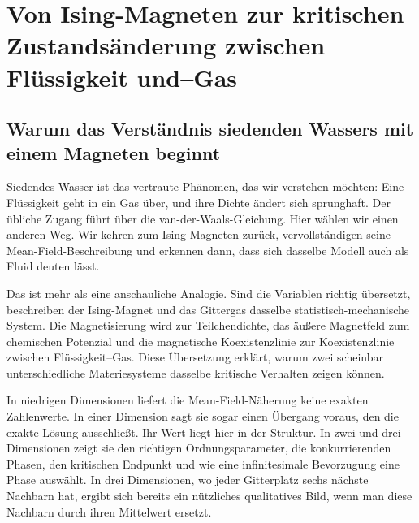 \chapter{Von Ising-Magneten zur kritischen Zustandsänderung zwischen Flüssigkeit und--Gas}


\section{Warum das Verständnis siedenden Wassers mit einem Magneten beginnt}

Siedendes Wasser ist das vertraute Phänomen, das wir verstehen möchten: Eine Flüssigkeit geht in ein Gas über, und ihre Dichte ändert sich sprunghaft. Der übliche Zugang führt über die van-der-Waals-Gleichung. Hier wählen wir einen anderen Weg. Wir kehren zum Ising-Magneten zurück, vervollständigen seine Mean-Field-Beschreibung und erkennen dann, dass sich dasselbe Modell auch als Fluid deuten lässt.

Das ist mehr als eine anschauliche Analogie. Sind die Variablen richtig übersetzt, beschreiben der Ising-Magnet und das Gittergas dasselbe statistisch-mechanische System. Die Magnetisierung wird zur Teilchendichte, das äußere Magnetfeld zum chemischen Potenzial und die magnetische Koexistenzlinie zur Koexistenzlinie zwischen Flüssigkeit--Gas. Diese Übersetzung erklärt, warum zwei scheinbar unterschiedliche Materiesysteme dasselbe kritische Verhalten zeigen können.

In niedrigen Dimensionen liefert die Mean-Field-Näherung keine exakten Zahlenwerte. In einer Dimension sagt sie sogar einen Übergang voraus, den die exakte Lösung ausschließt. Ihr Wert liegt hier in der Struktur. In zwei und drei Dimensionen zeigt sie den richtigen Ordnungsparameter, die konkurrierenden Phasen, den kritischen Endpunkt und wie eine infinitesimale Bevorzugung eine Phase auswählt. In drei Dimensionen, wo jeder Gitterplatz sechs nächste Nachbarn hat, ergibt sich bereits ein nützliches qualitatives Bild, wenn man diese Nachbarn durch ihren Mittelwert ersetzt.

